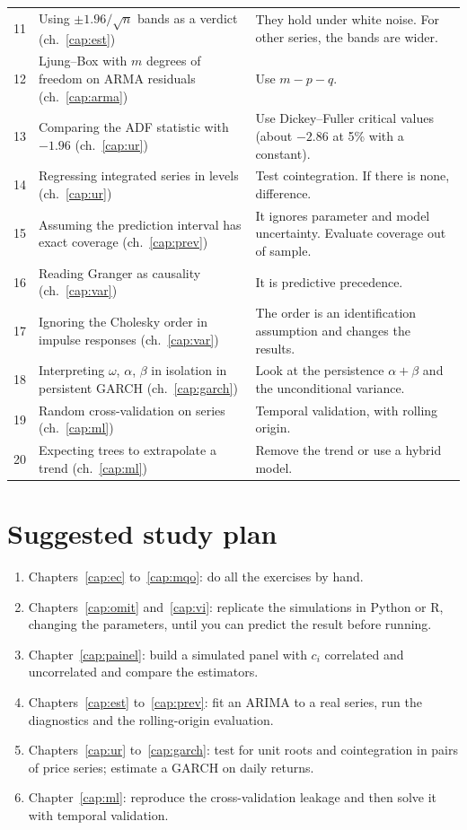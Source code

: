 \begin{center}
\begin{longtable}{p{0.5cm}p{6.6cm}p{6.5cm}}
11 & Using $\pm1.96/\sqrt n$ bands as a verdict (ch.~\ref{cap:est}) & They hold under white noise. For other series, the bands are wider. \\
12 & Ljung--Box with $m$ degrees of freedom on ARMA residuals (ch.~\ref{cap:arma}) & Use $m-p-q$. \\
13 & Comparing the ADF statistic with $-1.96$ (ch.~\ref{cap:ur}) & Use Dickey--Fuller critical values (about $-2.86$ at 5\% with a constant). \\
14 & Regressing integrated series in levels (ch.~\ref{cap:ur}) & Test cointegration. If there is none, difference. \\
15 & Assuming the prediction interval has exact coverage (ch.~\ref{cap:prev}) & It ignores parameter and model uncertainty. Evaluate coverage out of sample. \\
16 & Reading Granger as causality (ch.~\ref{cap:var}) & It is predictive precedence. \\
17 & Ignoring the Cholesky order in impulse responses (ch.~\ref{cap:var}) & The order is an identification assumption and changes the results. \\
18 & Interpreting $\omega$, $\alpha$, $\beta$ in isolation in persistent GARCH (ch.~\ref{cap:garch}) & Look at the persistence $\alpha+\beta$ and the unconditional variance. \\
19 & Random cross-validation on series (ch.~\ref{cap:ml}) & Temporal validation, with rolling origin. \\
20 & Expecting trees to extrapolate a trend (ch.~\ref{cap:ml}) & Remove the trend or use a hybrid model. \\
\bottomrule
\end{longtable}
\end{center}

\section*{Suggested study plan}
\begin{enumerate}[leftmargin=1.6em]
\item Chapters~\ref{cap:ec} to~\ref{cap:mqo}: do all the exercises by hand.
\item Chapters~\ref{cap:omit} and~\ref{cap:vi}: replicate the simulations in Python or R, changing the parameters, until you can predict the result before running.
\item Chapter~\ref{cap:painel}: build a simulated panel with $c_i$ correlated and uncorrelated and compare the estimators.
\item Chapters~\ref{cap:est} to~\ref{cap:prev}: fit an ARIMA to a real series, run the diagnostics and the rolling-origin evaluation.
\item Chapters~\ref{cap:ur} to~\ref{cap:garch}: test for unit roots and cointegration in pairs of price series; estimate a GARCH on daily returns.
\item Chapter~\ref{cap:ml}: reproduce the cross-validation leakage and then solve it with temporal validation.
\end{enumerate}
